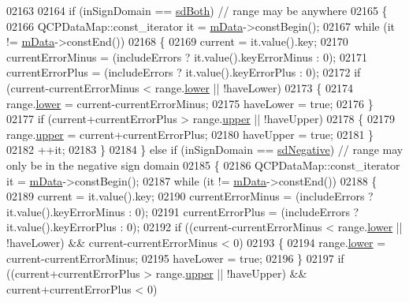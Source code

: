 \begin{DoxyCode}
02163   
02164   \textcolor{keywordflow}{if} (inSignDomain == \hyperlink{a00024_a661743478a1d3c09d28ec2711d7653d8a082b98cfb91a7363a3b5cd17b0c1cd60}{sdBoth}) \textcolor{comment}{// range may be anywhere}
02165   \{
02166     QCPDataMap::const\_iterator it = \hyperlink{a00031_a8457c840f69a0ac49f61d30a509c5d08}{mData}->constBegin();
02167     \textcolor{keywordflow}{while} (it != \hyperlink{a00031_a8457c840f69a0ac49f61d30a509c5d08}{mData}->constEnd())
02168     \{
02169       current = it.value().key;
02170       currentErrorMinus = (includeErrors ? it.value().keyErrorMinus : 0);
02171       currentErrorPlus = (includeErrors ? it.value().keyErrorPlus : 0);
02172       \textcolor{keywordflow}{if} (current-currentErrorMinus < range.\hyperlink{a00049_aa3aca3edb14f7ca0c85d912647b91745}{lower} || !haveLower)
02173       \{
02174         range.\hyperlink{a00049_aa3aca3edb14f7ca0c85d912647b91745}{lower} = current-currentErrorMinus;
02175         haveLower = \textcolor{keyword}{true};
02176       \}
02177       \textcolor{keywordflow}{if} (current+currentErrorPlus > range.\hyperlink{a00049_ae44eb3aafe1d0e2ed34b499b6d2e074f}{upper} || !haveUpper)
02178       \{
02179         range.\hyperlink{a00049_ae44eb3aafe1d0e2ed34b499b6d2e074f}{upper} = current+currentErrorPlus;
02180         haveUpper = \textcolor{keyword}{true};
02181       \}
02182       ++it;
02183     \}
02184   \} \textcolor{keywordflow}{else} \textcolor{keywordflow}{if} (inSignDomain == \hyperlink{a00024_a661743478a1d3c09d28ec2711d7653d8a0fc9a70796ef60ad18ddd18056e6dc63}{sdNegative}) \textcolor{comment}{// range may only be in the negative sign domain}
02185   \{
02186     QCPDataMap::const\_iterator it = \hyperlink{a00031_a8457c840f69a0ac49f61d30a509c5d08}{mData}->constBegin();
02187     \textcolor{keywordflow}{while} (it != \hyperlink{a00031_a8457c840f69a0ac49f61d30a509c5d08}{mData}->constEnd())
02188     \{
02189       current = it.value().key;
02190       currentErrorMinus = (includeErrors ? it.value().keyErrorMinus : 0);
02191       currentErrorPlus = (includeErrors ? it.value().keyErrorPlus : 0);
02192       \textcolor{keywordflow}{if} ((current-currentErrorMinus < range.\hyperlink{a00049_aa3aca3edb14f7ca0c85d912647b91745}{lower} || !haveLower) && current-currentErrorMinus < 0)
02193       \{
02194         range.\hyperlink{a00049_aa3aca3edb14f7ca0c85d912647b91745}{lower} = current-currentErrorMinus;
02195         haveLower = \textcolor{keyword}{true};
02196       \}
02197       \textcolor{keywordflow}{if} ((current+currentErrorPlus > range.\hyperlink{a00049_ae44eb3aafe1d0e2ed34b499b6d2e074f}{upper} || !haveUpper) && current+currentErrorPlus < 0)

\end{DoxyCode}

